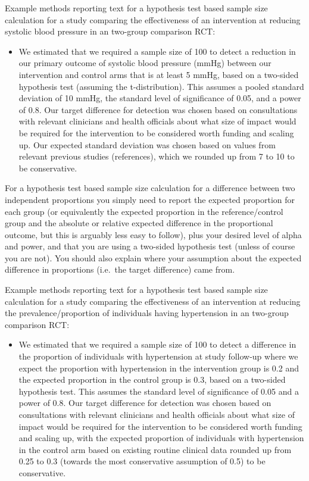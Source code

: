 \documentclass[
]{book}
\providecommand{\tightlist}{%
  \setlength{\itemsep}{0pt}\setlength{\parskip}{0pt}}
\begin{document}
Example methods reporting text for a hypothesis test based sample size calculation for a study comparing the effectiveness of an intervention at reducing systolic blood pressure in an two-group comparison RCT:

\begin{itemize}
\tightlist
\item
  We estimated that we required a sample size of 100 to detect a reduction in our primary outcome of systolic blood pressure (mmHg) between our intervention and control arms that is at least 5 mmHg, based on a two-sided hypothesis test (assuming the t-distribution). This assumes a pooled standard deviation of 10 mmHg, the standard level of significance of 0.05, and a power of 0.8. Our target difference for detection was chosen based on consultations with relevant clinicians and health officials about what size of impact would be required for the intervention to be considered worth funding and scaling up. Our expected standard deviation was chosen based on values from relevant previous studies (references), which we rounded up from 7 to 10 to be conservative.
\end{itemize}

For a hypothesis test based sample size calculation for a difference between two independent proportions you simply need to report the expected proportion for each group (or equivalently the expected proportion in the reference/control group and the absolute or relative expected difference in the proportional outcome, but this is arguably less easy to follow), plus your desired level of alpha and power, and that you are using a two-sided hypothesis test (unless of course you are not). You should also explain where your assumption about the expected difference in proportions (i.e.~the target difference) came from.

Example methods reporting text for a hypothesis test based sample size calculation for a study comparing the effectiveness of an intervention at reducing the prevalence/proportion of individuals having hypertension in an two-group comparison RCT:

\begin{itemize}
\tightlist
\item
  We estimated that we required a sample size of 100 to detect a difference in the proportion of individuals with hypertension at study follow-up where we expect the proportion with hypertension in the intervention group is 0.2 and the expected proportion in the control group is 0.3, based on a two-sided hypothesis test. This assumes the standard level of significance of 0.05 and a power of 0.8. Our target difference for detection was chosen based on consultations with relevant clinicians and health officials about what size of impact would be required for the intervention to be considered worth funding and scaling up, with the expected proportion of individuals with hypertension in the control arm based on existing routine clinical data rounded up from 0.25 to 0.3 (towards the most conservative assumption of 0.5) to be conservative.
\end{itemize}
\end{document}
